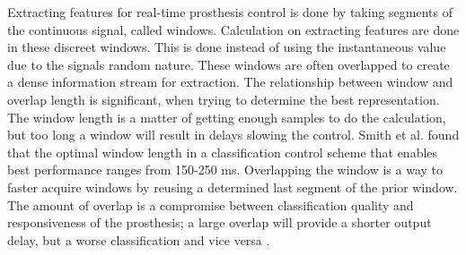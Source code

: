 Extracting features for real-time prosthesis control is done by taking segments of the continuous signal, called windows. Calculation on extracting features are done in these discreet windows. This is done instead of using the instantaneous value due to the signals random nature. These windows are often overlapped to create a dense information stream for extraction. The relationship between window and overlap length is significant, when trying to determine the best representation. The window length is a matter of getting enough samples to do the calculation, but too long a window will result in delays slowing the control. Smith et al. \cite{Smith2014} found that the optimal window length in a classification control scheme that enables best performance ranges from 150-250 ms. Overlapping the window is a way to faster acquire windows by reusing a determined last segment of the prior window. The amount of overlap is a compromise between classification quality and responsiveness of the prosthesis; a large overlap will provide a shorter output delay, but a worse classification and vice versa \cite{Farrell2007}.
